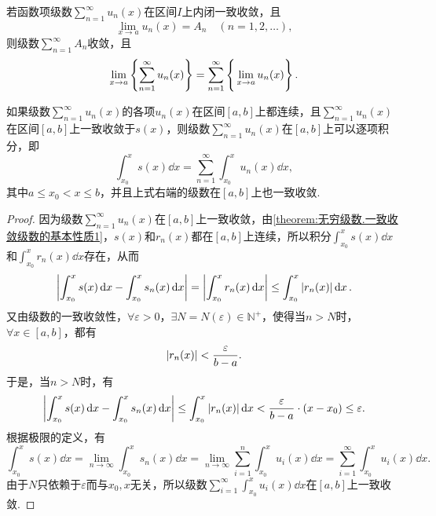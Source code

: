 \begin{property}\label{theorem:无穷级数.一致收敛级数的基本性质2}
若函数项级数\(\sum\limits_{n=1}^\infty u_n(x)\)在区间\(I\)上内闭一致收敛，且\[
\lim\limits_{x \to a} u_n(x) = A_n
\quad(n=1,2,\dotsc),
\]
则级数\(\sum\limits_{n=1}^\infty A_n\)收敛，且\[
\lim\limits_{x \to a} \left\{
	\sum\limits_{n=1}^\infty u_n(x)
\right\}
= \sum\limits_{n=1}^\infty \left\{
	\vphantom{\sum\limits_{n=1}^\infty }
	\lim\limits_{x \to a} u_n(x)
\right\}.
\]
\end{property}

\begin{property}\label{theorem:无穷级数.一致收敛级数的基本性质3}
\def\s{\sum\limits_{n=1}^\infty }
如果级数\(\s u_n(x)\)的各项\(u_n(x)\)在区间\([a,b]\)上都连续，且\(\s u_n(x)\)在区间\([a,b]\)上一致收敛于\(s(x)\)，则级数\(\s u_n(x)\)在\([a,b]\)上可以逐项积分，即\[
\int_{x_0}^x s(x) \dd{x}
= \s \int_{x_0}^x u_n(x) \dd{x},
\]其中\(a \leq x_0 < x \leq b\)，并且上式右端的级数在\([a,b]\)上也一致收敛.
\begin{proof}
因为级数\(\s u_n(x)\)在\([a,b]\)上一致收敛，由\cref{theorem:无穷级数.一致收敛级数的基本性质1}，\(s(x)\)和\(r_n(x)\)都在\([a,b]\)上连续，所以积分\(\int_{x_0}^x s(x) \dd{x}\)和\(\int_{x_0}^x r_n(x) \dd{x}\)存在，从而\[
\abs{\int_{x_0}^x s(x) \dd{x} - \int_{x_0}^x s_n(x) \dd{x}}
= \abs{\int_{x_0}^x r_n(x) \dd{x}}
\leq \int_{x_0}^x \abs{r_n(x)} \dd{x}.
\]又由级数的一致收敛性，\(\forall\varepsilon>0\)，\(\exists N = N(\varepsilon) \in \mathbb{N}^+\)，使得当\(n > N\)时，\(\forall x \in [a,b]\)，都有\[
\abs{r_n(x)} < \frac{\varepsilon}{b-a}.
\]于是，当\(n > N\)时，有\[
\abs{\int_{x_0}^x s(x) \dd{x} - \int_{x_0}^x s_n(x) \dd{x}}
\leq \int_{x_0}^x \abs{r_n(x)} \dd{x}
< \frac{\varepsilon}{b-a} \cdot (x-x_0)
\leq \varepsilon.
\]根据极限的定义，有\[
\int_{x_0}^x s(x) \dd{x}
= \lim\limits_{n\to\infty} \int_{x_0}^x s_n(x) \dd{x}
= \lim\limits_{n\to\infty} \sum\limits_{i=1}^n \int_{x_0}^x u_i(x) \dd{x}
= \sum\limits_{i=1}^\infty \int_{x_0}^x u_i(x) \dd{x}.
\]由于\(N\)只依赖于\(\varepsilon\)而与\(x_0,x\)无关，所以级数\(\sum\limits_{i=1}^\infty \int_{x_0}^x u_i(x) \dd{x}\)在\([a,b]\)上一致收敛.
\end{proof}
\end{property}

